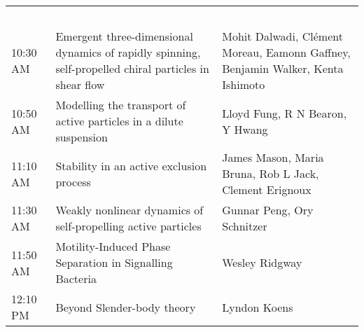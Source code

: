 \begin{tabularx}{\linewidth}{C{15mm}YP{50mm}}
\textcolor{white}{\textbf{4Q56}} & & \\
10:30 AM & Emergent three-dimensional dynamics of rapidly spinning, self-propelled chiral particles in shear flow & Mohit Dalwadi, Clément Moreau, Eamonn Gaffney, Benjamin Walker, Kenta Ishimoto\\
10:50 AM & Modelling the transport of active particles in a dilute suspension & Lloyd Fung, R N Bearon, Y Hwang\\
11:10 AM & Stability in an active exclusion process & James Mason, Maria Bruna, Rob L Jack, Clement Erignoux\\
11:30 AM & Weakly nonlinear dynamics of self-propelling active particles & Gunnar Peng, Ory Schnitzer\\
11:50 AM & Motility-Induced Phase Separation in Signalling Bacteria & Wesley Ridgway\\
12:10 PM & Beyond Slender-body theory  & Lyndon Koens\\
\end{tabularx}

